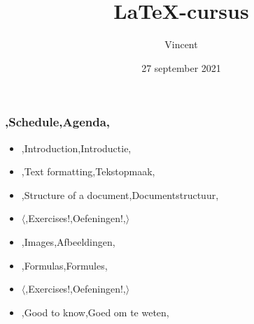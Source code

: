 


\def\importslide#1#2{%
	{#2}
}

\title{\LaTeX{}-cursus}
\author{Vincent}
\date{27 september 2021}





\begin{frame}
	\titlepage
	\centering
\end{frame}

\begin{frame}
	\frametitle{\lang,Schedule,Agenda,}
	
	\begin{itemize}
		\item \lang,Introduction,Introductie,
		\item \lang,Text formatting,Tekstopmaak,
		\item \lang,Structure of a document,Documentstructuur,
		\item $ \langle $\lang,Exercises!,Oefeningen!,$ \rangle $
		\item \lang,Images,Afbeeldingen,
		\item \lang,Formulas,Formules,
		\item $ \mathbf\langle $\lang,Exercises!,Oefeningen!,$ \rangle $
		\item \lang,Good to know,Goed om te weten,
	\end{itemize}
\end{frame}











% 



